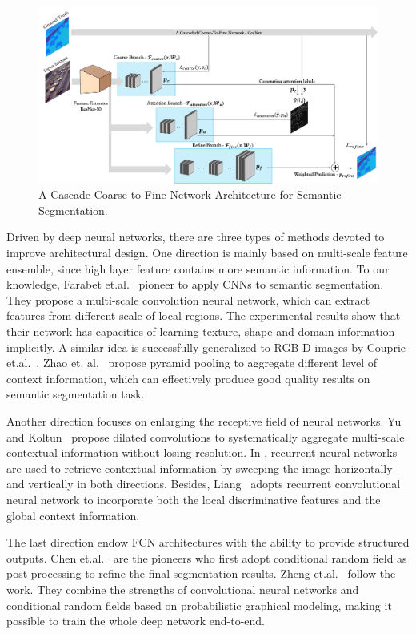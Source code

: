 \documentclass[10.5pt,compsoc]{TsT}
\newcommand{\upcite}[1]{\superscript{\textsuperscript{\cite{#1}}}}
\theoremstyle{mystyle}
\newcommand{\upcite}[1]{\textsuperscript{\cite{#1}}}
\begin{document}
{\begin{figure}[!ht]
\centering
\includegraphics[width=1.9\columnwidth]{fig2.png}
\caption{A Cascade Coarse to Fine Network Architecture for Semantic Segmentation.}
\label{fig2}
\end{figure} 

Driven by deep neural networks, there are three types of methods devoted to improve architectural design. One direction is mainly based on multi-scale feature ensemble, since high layer feature contains more semantic information. To our knowledge,  Farabet et.al.~\upcite{11}  pioneer to apply CNNs to semantic segmentation. They propose a multi-scale convolution neural network, which can extract features from different scale of local regions. The experimental results show that their network has capacities of learning texture, shape and domain information implicitly. A similar idea is successfully generalized to RGB-D images by Couprie et.al.~\upcite{12}. Zhao et. al.~\upcite{21} propose pyramid pooling to aggregate different level of context information, which can effectively produce good quality results on semantic segmentation task.

Another direction focuses on enlarging the receptive field of neural networks. Yu and Koltun~\upcite{29} propose dilated convolutions to systematically aggregate multi-scale contextual information without losing resolution. In \cite{30}, recurrent neural networks are used to retrieve contextual information by sweeping the image horizontally and vertically in both directions. Besides, Liang~\upcite{24} adopts recurrent convolutional neural network to incorporate both the local discriminative features and the global context information.

The last direction endow FCN architectures with the ability to provide structured outputs. 
Chen et.al.~\upcite{31} are the pioneers who first adopt conditional random field  as post processing to refine the final segmentation results. Zheng et.al.~\upcite{32} follow the work. They combine
the strengths of convolutional neural networks and conditional random fields based on probabilistic graphical modeling, making it possible to train the whole deep network end-to-end.

}
\end{document}
